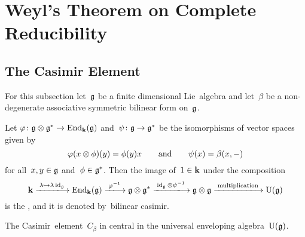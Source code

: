 \section{Weyl’s Theorem on Complete Reducibility}



\subsection{The Casimir Element}


\begin{convention}
  For this subsection let~$\mathfrak{g}$ be a finite dimensional Lie~algebra and let~$\beta$ be a non-degenerate associative symmetric bilinear form on~$\mathfrak{g}$.
\end{convention}


\begin{definition}
  \label{definition of casimir}
  Let $\varphi \colon \mathfrak{g} \otimes \mathfrak{g}^* \to \operatorname{End}_{\mathbf{k}}(\mathfrak{g})$ and~$\psi \colon \mathfrak{g} \to \mathfrak{g}^*$ be the isomorphisms of vector spaces given by
  \[
    \varphi(x \otimes \phi)(y) = \phi(y) x
    \qquad\text{and}\qquad
    \psi(x) = \beta(x, -)
  \]  
  for all~$x,y \in \mathfrak{g}$ and~$\phi \in \mathfrak{g}^*$.
  Then the image of~$1 \in \mathbf{k}$ under the composition
  \begin{equation}
    \label{casimir without coordinates}
    \kf
    \xlongto{\lambda \mapsto \lambda \id_{\glie}}
    \End_{\kf}(\glie)
    \xlongto{\varphi^{-1}}
    \glie \tensor \glie^*
    \xlongto{\id_{\glie} \tensor \psi^{-1}}
    \glie \tensor \glie
    \xlongto{\text{multiplication}}
    \Univ(\glie)
  \end{equation}
  is the , and it is denoted by~\gls*{bilinear casimir}.
\end{definition}


\begin{lemma}
  The Casimir~element~$C_\beta$ in central in the universal enveloping algebra~$\operatorname{U}(\mathfrak{g})$.
\end{lemma}


